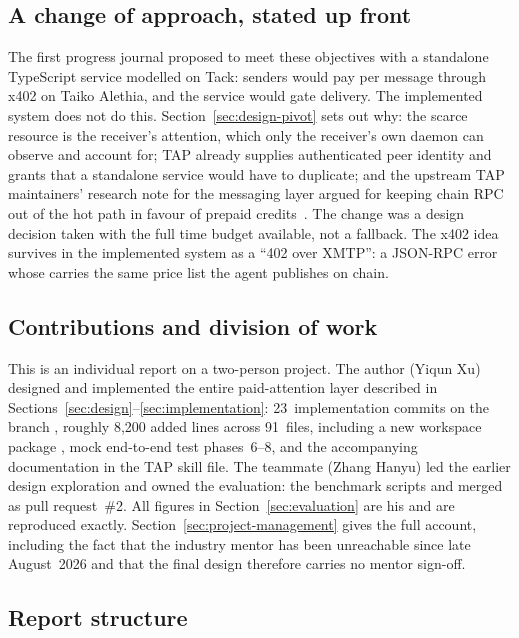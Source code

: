 \subsection{A change of approach, stated up front}

The first progress journal proposed to meet these objectives with a standalone
TypeScript service modelled on Tack: senders would pay per message through x402 on Taiko
Alethia, and the service would gate delivery. The implemented system does not do this.
Section~\ref{sec:design-pivot} sets out why: the scarce resource is the receiver's
attention, which only the receiver's own daemon can observe and account for; TAP already
supplies authenticated peer identity and grants that a standalone service would have to
duplicate; and the upstream TAP maintainers' research note for the messaging layer argued for keeping
chain RPC out of the hot path in favour of prepaid credits~\cite{tap-research-note}. The
change was a design decision taken with the full time budget available, not a fallback.
The x402 idea survives in the implemented system as a ``402 over XMTP'': a JSON-RPC
 error whose  carries the same price list the agent publishes on
chain.

\subsection{Contributions and division of work}

This is an individual report on a two-person project. The author (Yiqun Xu) designed and
implemented the entire paid-attention layer described in
Sections~\ref{sec:design}--\ref{sec:implementation}: 23~implementation commits on the
branch , roughly 8{,}200 added lines across
91~files, including a new workspace package , mock
end-to-end test phases~6--8, and the accompanying documentation in the TAP skill file. The
teammate (Zhang Hanyu) led the earlier design exploration and owned the evaluation:
the benchmark scripts and  merged as pull request~\#2. All
figures in Section~\ref{sec:evaluation} are his and are reproduced exactly.
Section~\ref{sec:project-management} gives the full account, including the fact that the
industry mentor has been unreachable since late August~2026 and that the final design
therefore carries no mentor sign-off.

\subsection{Report structure}

